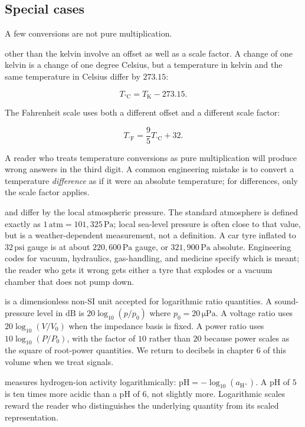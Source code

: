 \subsection{Special cases}

A few conversions are not pure multiplication.

 other than the kelvin involve an offset
as well as a scale factor. A change of one kelvin is a change of one
degree Celsius, but a temperature in kelvin and the same temperature
in Celsius differ by $273.15$:

\[
T_{\si{\degreeCelsius}} = T_{\si{\kelvin}} - 273.15.
\]

The Fahrenheit scale uses both a different offset and a different
scale factor:

\[
T_{{}^{\circ}\mathrm{F}} = \frac{9}{5} T_{{}^{\circ}\mathrm{C}} + 32.
\]

A reader who treats temperature conversions as pure multiplication
will produce wrong answers in the third digit. A common engineering
mistake is to convert a temperature \emph{difference} as if it were
an absolute temperature; for differences, only the scale factor
applies.

 and  differ by
the local atmospheric pressure. The standard atmosphere is defined
exactly as $1\,\text{atm} = 101{,}325 \,\si{\pascal}$; local sea-level
pressure is often close to that value, but is a weather-dependent
measurement, not a definition. A car tyre inflated to
$32\,\text{psi}$ gauge is at about
$220{,}600 \,\si{\pascal}$ gauge, or $321{,}900 \,\si{\pascal}$
absolute. Engineering codes for vacuum, hydraulics, gas-handling, and
medicine specify which is meant; the reader who gets it wrong gets
either a tyre that explodes or a vacuum chamber that does not pump
down.

 is a dimensionless non-SI unit accepted for
logarithmic ratio quantities. A sound-pressure level in
$\si{\deci\bel}$ is $20 \log_{10}(p/p_{0})$ where
$p_{0} = 20 \,\si{\micro\pascal}$. A voltage ratio uses
$20 \log_{10}(V/V_{0})$ when the impedance basis is fixed. A power
ratio uses $10 \log_{10}(P/P_{0})$, with the factor of $10$ rather
than $20$ because power scales as the square of root-power
quantities. We return to decibels in chapter 6 of this volume when we
treat signals.

 measures hydrogen-ion activity logarithmically:
$\mathrm{pH} = -\log_{10}(a_{\mathrm{H}^{+}})$. A pH of $5$ is ten
times more acidic than a pH of $6$, not slightly more. Logarithmic
scales reward the reader who distinguishes the underlying quantity
from its scaled representation.

